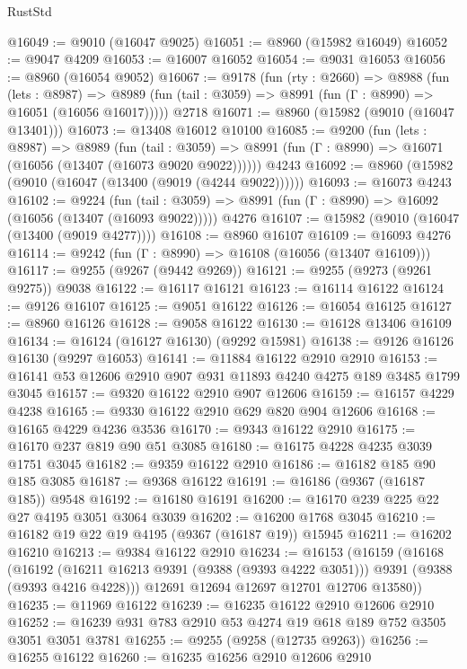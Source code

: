 \begin{lexlean}{RustStd}
\begin{coremodule}
@16049 := @9010 (@16047 @9025)
@16051 := @8960 (@15982 @16049)
@16052 := @9047 @4209
@16053 := @16007 @16052
@16054 := @9031 @16053
@16056 := @8960 (@16054 @9052)
@16067 := @9178
    (fun (rty : @2660) =>
    @8988
      (fun (lets : @8987) =>
      @8989 (fun (tail : @3059) => @8991 (fun (Γ : @8990) => @16051 (@16056 @16017)))))
    @2718
@16071 := @8960 (@15982 (@9010 (@16047 @13401)))
@16073 := @13408 @16012 @10100
@16085 := @9200
    (fun (lets : @8987) =>
    @8989
      (fun (tail : @3059) =>
      @8991 (fun (Γ : @8990) => @16071 (@16056 (@13407 (@16073 @9020 @9022))))))
    @4243
@16092 := @8960 (@15982 (@9010 (@16047 (@13400 (@9019 (@4244 @9022))))))
@16093 := @16073 @4243
@16102 := @9224
    (fun (tail : @3059) => @8991 (fun (Γ : @8990) => @16092 (@16056 (@13407 (@16093 @9022)))))
    @4276
@16107 := @15982 (@9010 (@16047 (@13400 (@9019 @4277))))
@16108 := @8960 @16107
@16109 := @16093 @4276
@16114 := @9242 (fun (Γ : @8990) => @16108 (@16056 (@13407 @16109)))
@16117 := @9255 (@9267 (@9442 @9269))
@16121 := @9255 (@9273 (@9261 @9275)) @9038
@16122 := @16117 @16121
@16123 := @16114 @16122
@16124 := @9126 @16107
@16125 := @9051 @16122
@16126 := @16054 @16125
@16127 := @8960 @16126
@16128 := @9058 @16122
@16130 := @16128 @13406 @16109
@16134 := @16124 (@16127 @16130) (@9292 @15981)
@16138 := @9126 @16126 @16130 (@9297 @16053)
@16141 := @11884 @16122 @2910 @2910
@16153 := @16141 @53 @12606 @2910 @907 @931 @11893 @4240 @4275 @189 @3485 @1799 @3045
@16157 := @9320 @16122 @2910 @907 @12606
@16159 := @16157 @4229 @4238
@16165 := @9330 @16122 @2910 @629 @820 @904 @12606
@16168 := @16165 @4229 @4236 @3536
@16170 := @9343 @16122 @2910
@16175 := @16170 @237 @819 @90 @51 @3085
@16180 := @16175 @4228 @4235 @3039 @1751 @3045
@16182 := @9359 @16122 @2910
@16186 := @16182 @185 @90 @185 @3085
@16187 := @9368 @16122
@16191 := @16186 (@9367 (@16187 @185)) @9548
@16192 := @16180 @16191
@16200 := @16170 @239 @225 @22 @27 @4195 @3051 @3064 @3039
@16202 := @16200 @1768 @3045
@16210 := @16182 @19 @22 @19 @4195 (@9367 (@16187 @19)) @15945
@16211 := @16202 @16210
@16213 := @9384 @16122 @2910
@16234 := @16153
    (@16159
      (@16168
        (@16192 (@16211 @16213 @9391 (@9388 (@9393 @4222 @3051))) @9391 (@9388 (@9393 @4216 @4228)))
        @12691
        @12694
        @12697
        @12701
        @12706
        @13580))
@16235 := @11969 @16122
@16239 := @16235 @16122 @2910 @12606 @2910
@16252 := @16239 @931 @783 @2910 @53 @4274 @19 @618 @189 @752 @3505 @3051 @3051 @3781
@16255 := @9255 (@9258 (@12735 @9263))
@16256 := @16255 @16122
@16260 := @16235 @16256 @2910 @12606 @2910

\end{coremodule}
\end{lexlean}
